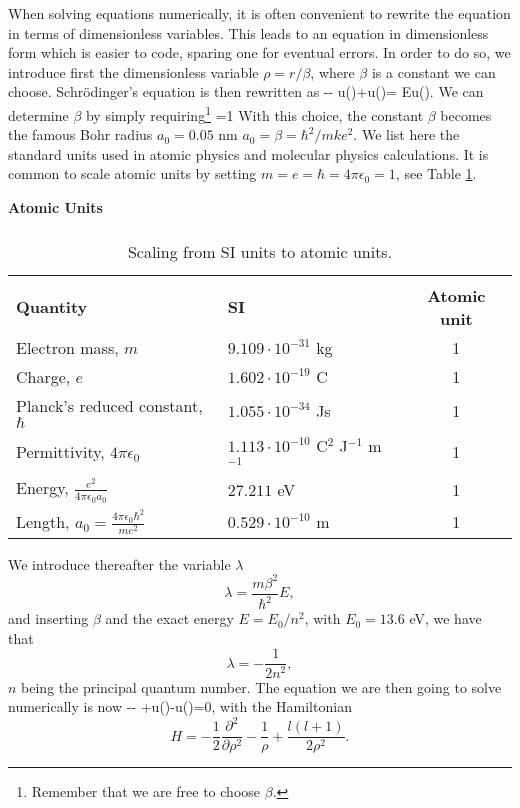 When solving equations numerically, it is often convenient to rewrite
the equation in terms of dimensionless variables. 
This leads to an equation in dimensionless
form which is easier to code, sparing one for eventual errors. 
In order to  do so, we introduce first the dimensionless variable
$\rho=r/\beta$, where $\beta$ is a constant we can choose.
Schr\"odinger's equation is then rewritten as 
\be
--
u(\rho)+u(\rho)=
Eu(\rho).
\ee
We can determine $\beta$ by simply requiring\footnote{Remember that we are free
to choose $\beta$.}
\be
    =1
\ee
With this choice, 
the constant $\beta$ becomes the famous Bohr radius $a_0=0.05$ nm
$a_0 =\beta ={\hbar^2}/{mke^2}$.
We list here the standard units used in atomic physics and molecular
physics calculations.  It is common to scale atomic units by setting
$m=e=\hbar=4\pi\epsilon_0=1$, see Table \ref{atomicUnits}. 
\begin{table}[hbtp]
\begin{center} {\bf Atomic Units} \\ 
$\phantom{a}$ \\
\begin{tabular}{llc}
\hline\\ 
{\bf Quantity}                 & {\bf SI}               & {\bf Atomic unit}\\
Electron mass, $m$               & $9.109\cdot 10^{-31}$ kg & 1 \\
Charge, $e$                      & $1.602\cdot 10^{-19}$ C  & 1 \\
Planck's reduced constant, $\hbar$& $1.055\cdot 10^{-34}$ Js& 1 \\       
Permittivity, $4\pi\epsilon_0$   & $1.113\cdot 10^{-10}$ C$^2$ J$^{-1}$ m$^{-1}$&1\\
Energy, $\frac{e^2}{4\pi\epsilon_0 a_0}$ & $27.211$ eV       & 1 \\
Length, $a_0=\frac{4\pi\epsilon_0 \hbar^2}{me^2}$&$0.529\cdot10^{-10}$ m&1\\ [10pt]      
\hline
\end{tabular} 
\end{center}
\caption{Scaling from SI units to atomic units.}
\label{atomicUnits}
\end{table}
We introduce thereafter the variable $\lambda$ 
\[
 \lambda = \frac{m\beta^2}{\hbar^2}E,
\]
and inserting $\beta$ and the exact energy  $E=E_0/n^2$, with
$E_0=13.6$ eV, we have that 
\[
 \lambda = -\frac{1}{2n^2},
\]
$n$ being the principal quantum number.
The equation we are then going to solve numerically is now
\be
--
+u(\rho)-\lambda u(\rho)=0,
\label{eq:hydrodimless1}
\ee
with the Hamiltonian
\[
H=-\frac{1}{2}\frac{\partial^2 }{\partial \rho^2}-
\frac{1}{\rho}+\frac{l(l+1)}{2\rho^2}.
\]

